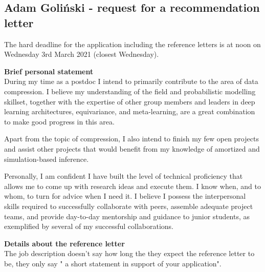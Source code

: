 \documentclass[12pt]{article}
\begin{document}


\subsection*{Adam Goli{\'n}ski - request for a recommendation letter}

The hard deadline for the application including the reference letters is at noon on Wednesday 3rd March 2021 (closest Wednesday).

\textbf{Brief personal statement}\\
During my time as a postdoc I intend to primarily contribute to the area of data compression.
I believe my understanding of the field and probabilistic modelling skillset, 
together with the expertise of other group members and leaders in deep learning architectures, equivariance, and meta-learning,
are a great combination to make good progress in this area.

Apart from the topic of compression, 
I also intend to finish my few open projects and  
assist other projects that would benefit from my knowledge of amortized and simulation-based inference.

Personally,
I am confident I have built the level of technical proficiency that allows me to come up with research ideas and execute them. 
I know when, and to whom, to turn for advice when I need it.
I believe I possess the interpersonal skills required to successfully collaborate with peers, assemble adequate project teams, and provide day-to-day mentorship and guidance to junior students, 
as exemplified by several of my successful collaborations.


\vspace{10pt}
\textbf{Details about the reference letter}\\
The job description doesn't say how long the they expect the reference letter to be, they only say " a short statement in support of your application".
\end{document}
